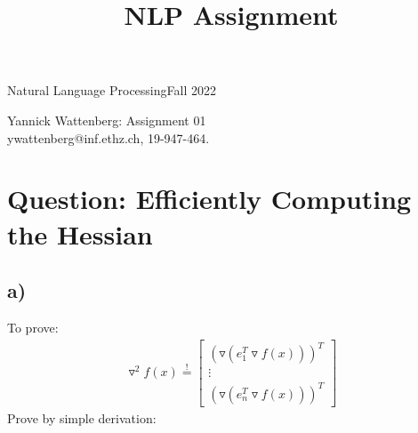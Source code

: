 \documentclass[a4paper,12pt]{ETHexercise}
\title{NLP Assignment}
\begin{document}



{}
{\Large Natural Language Processing}{Fall 2022}
\begin{center}
    {\Huge Yannick Wattenberg: Assignment 01}\\
      \quad\newline
      ywattenberg@inf.ethz.ch, 19-947-464.\\
      \quad\newline
    \timestamp

\end{center}
\section{Question: Efficiently Computing the Hessian}
\subsection*{a)}
To prove:
\begin{align}
    \triangledown^2f(x) \overset{!}{=} 
    \left[ \begin{array}{c}
         (\triangledown(e_1^T \triangledown f(x)))^T  \\
          \vdots \\
         (\triangledown(e_n^T \triangledown f(x)))^T      
    \end{array} \right]
\end{align}
Prove by simple derivation:
\end{document}
